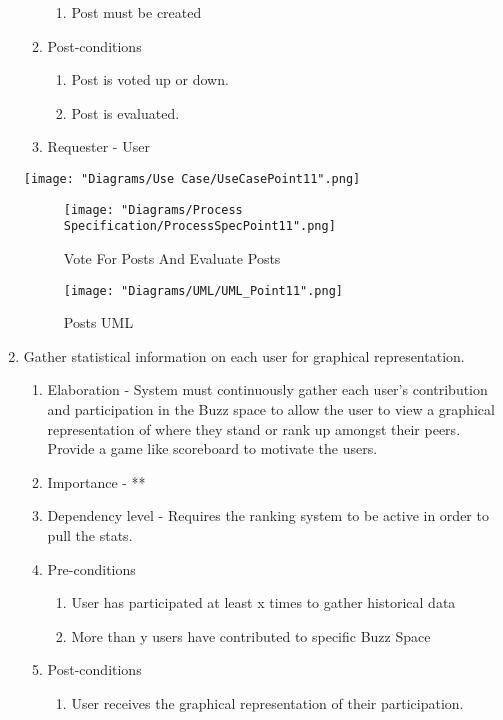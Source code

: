 \documentclass[12pt]{article}
\begin{document}
\begin{enumerate}
\begin{enumerate}
    \begin{enumerate}
    	\item Post must be created
    \end{enumerate}
        \item Post-conditions
    \begin{enumerate}
    	\item Post is voted up or down.
    	\item Post is evaluated.
    \end{enumerate}
    \item Requester - User
  \end{enumerate}
  	\texttt{[image: "Diagrams/Use Case/UseCasePoint11".png]}
	  \begin{figure}[h]
  		\centering
  		\texttt{[image: "Diagrams/Process Specification/ProcessSpecPoint11".png]}
  		\caption{Vote For Posts And Evaluate Posts}
  	\end{figure}
		\begin{figure}[h]
  		\centering
  		\texttt{[image: "Diagrams/UML/UML\_Point11".png]}
  		\caption{Posts UML}
  	\end{figure}
\clearpage %
   \item Gather statistical information on each user for graphical representation. %
  \begin{enumerate}
    \item Elaboration - System must continuously gather each user’s contribution and participation in the Buzz space to allow the user to view a graphical representation of where they stand or rank up amongst their peers. Provide a game like scoreboard to motivate the users.
    \item Importance - **
    \item Dependency level - Requires the ranking system to be active in order to pull the stats. 
    \item Pre-conditions
    \begin{enumerate}
    	\item User has participated at least x times to gather historical data
    	\item More than y users have contributed to specific Buzz Space
    \end{enumerate}
        \item Post-conditions
    \begin{enumerate}
    	\item User receives the graphical representation of their participation.

\end{enumerate}
\end{enumerate}
\end{enumerate}
\end{document}
